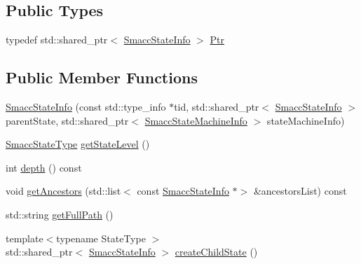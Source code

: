 \subsection*{Public Types}
\begin{DoxyCompactItemize}
\item 
typedef std\+::shared\+\_\+ptr$<$ \hyperlink{classsmacc_1_1introspection_1_1SmaccStateInfo}{Smacc\+State\+Info} $>$ \hyperlink{classsmacc_1_1introspection_1_1SmaccStateInfo_a374ef2022bca958ab14469931fc4dcc1}{Ptr}
\end{DoxyCompactItemize}
\subsection*{Public Member Functions}
\begin{DoxyCompactItemize}
\item 
\hyperlink{classsmacc_1_1introspection_1_1SmaccStateInfo_a262bc6242d8a3b2c29c34b4cf325dfb4}{Smacc\+State\+Info} (const std\+::type\+\_\+info $\ast$tid, std\+::shared\+\_\+ptr$<$ \hyperlink{classsmacc_1_1introspection_1_1SmaccStateInfo}{Smacc\+State\+Info} $>$ parent\+State, std\+::shared\+\_\+ptr$<$ \hyperlink{classsmacc_1_1introspection_1_1SmaccStateMachineInfo}{Smacc\+State\+Machine\+Info} $>$ state\+Machine\+Info)
\item 
\hyperlink{namespacesmacc_1_1introspection_a710cf406873961567c11027582c7f720}{Smacc\+State\+Type} \hyperlink{classsmacc_1_1introspection_1_1SmaccStateInfo_a360141a4883f0122a9f5e8b7de456084}{get\+State\+Level} ()
\item 
int \hyperlink{classsmacc_1_1introspection_1_1SmaccStateInfo_a961aa6a03d8e2f60b57ec3eab08bc6ba}{depth} () const
\item 
void \hyperlink{classsmacc_1_1introspection_1_1SmaccStateInfo_a6c825d62544c28f3d95aa3ec4da8eebb}{get\+Ancestors} (std\+::list$<$ const \hyperlink{classsmacc_1_1introspection_1_1SmaccStateInfo}{Smacc\+State\+Info} $\ast$$>$ \&ancestors\+List) const
\item 
std\+::string \hyperlink{classsmacc_1_1introspection_1_1SmaccStateInfo_a22e625806a74808ee272df5c034d122e}{get\+Full\+Path} ()
\item 
{\footnotesize template$<$typename State\+Type $>$ }\\std\+::shared\+\_\+ptr$<$ \hyperlink{classsmacc_1_1introspection_1_1SmaccStateInfo}{Smacc\+State\+Info} $>$ \hyperlink{classsmacc_1_1introspection_1_1SmaccStateInfo_a287664f0ac1c0380bad11ef6973cde8d}{create\+Child\+State} ()
\item 
$$
\end{DoxyCompactItemize}
